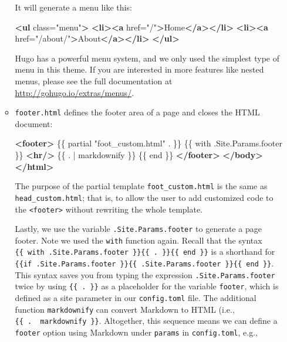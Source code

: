 \documentclass[12pt,]{krantz}
\makeatletter
\newenvironment{Shaded}{\begin{snugshade}}{\end{snugshade}}
\newcommand{\KeywordTok}[1]{\textcolor[rgb]{0.13,0.29,0.53}{\textbf{#1}}}
\newcommand{\NormalTok}[1]{#1}
\newcommand{\OtherTok}[1]{\textcolor[rgb]{0.56,0.35,0.01}{#1}}
\newcommand{\StringTok}[1]{\textcolor[rgb]{0.31,0.60,0.02}{#1}}
\newenvironment{kframe}{%
\medskip{}
\setlength{\fboxsep}{.8em}
 \def\at@end@of@kframe{}%
 \ifinner\ifhmode%
  \def\at@end@of@kframe{\end{minipage}}%
  \begin{minipage}{\columnwidth}%
 \fi\fi%
 \def\FrameCommand##1{\hskip\@totalleftmargin \hskip-\fboxsep
 \colorbox{shadecolor}{##1}\hskip-\fboxsep
     \hskip-\linewidth \hskip-\@totalleftmargin \hskip\columnwidth}%
 \MakeFramed {\advance\hsize-\width
   \@totalleftmargin\z@ \linewidth\hsize
   \@setminipage}}%
 {\par\unskip\endMakeFramed%
 \at@end@of@kframe}
\renewenvironment{Shaded}{\begin{kframe}}{\end{kframe}}
\theoremstyle{definition}
\theoremstyle{definition}
\theoremstyle{definition}
\theoremstyle{remark}
\makeatother
\begin{document}
\begin{itemize}
\begin{itemize}
    It will generate a menu like this:

\begin{Shaded}
\begin{Highlighting}[]
\KeywordTok{<ul}\OtherTok{ class=}\StringTok{"menu"}\KeywordTok{>}
  \KeywordTok{<li><a}\OtherTok{ href=}\StringTok{"/"}\KeywordTok{>}\NormalTok{Home}\KeywordTok{</a></li>}
  \KeywordTok{<li><a}\OtherTok{ href=}\StringTok{"/about/"}\KeywordTok{>}\NormalTok{About}\KeywordTok{</a></li>}
\KeywordTok{</ul>}
\end{Highlighting}
\end{Shaded}

    Hugo has a powerful menu system, and we only used the simplest type
    of menu in this theme. If you are interested in more features like
    nested menus, please see the full documentation at
    \url{http://gohugo.io/extras/menus/}.
  \item
    \texttt{footer.html} defines the footer area of a
    page and closes the HTML document:

\begin{Shaded}
\begin{Highlighting}[]
  \KeywordTok{<footer>}
\NormalTok{  \{\{ partial "foot_custom.html" . \}\}}
\NormalTok{  \{\{ with .Site.Params.footer \}\}}
  \KeywordTok{<hr/>}
\NormalTok{  \{\{ . | markdownify \}\}}
\NormalTok{  \{\{ end \}\}}
  \KeywordTok{</footer>}
  \KeywordTok{</body>}
\KeywordTok{</html>}
\end{Highlighting}
\end{Shaded}

    The purpose of the partial template \texttt{foot\_custom.html} is
    the same as \texttt{head\_custom.html}; that is, to allow the user
    to add customized code to the
    \texttt{\textless{}footer\textgreater{}} without rewriting the whole
    template.

    Lastly, we use the variable \texttt{.Site.Params.footer} to generate
    a page footer. Note we used the \texttt{with} function again. Recall
    that the syntax
    \texttt{\{\{\ with\ .Site.Params.footer\ \}\}\{\{\ .\ \}\}\{\{\ end\ \}\}}
    is a shorthand for
    \texttt{\{\{if\ .Site.Params.footer\ \}\}\{\{\ .Site.Params.footer\ \}\}\{\{\ end\ \}\}}.
    This syntax saves you from typing the expression
    \texttt{.Site.Params.footer} twice by using \texttt{\{\{\ .\ \}\}}
    as a placeholder for the variable \texttt{footer}, which is defined
    as a site parameter in our \texttt{config.toml} file. The additional
    function \texttt{markdownify} can convert Markdown to HTML (i.e.,
    \texttt{\{\{\ .\ \textbar{}\ markdownify\ \}\}}. Altogether, this
    sequence means we can define a \texttt{footer} option using Markdown
    under \texttt{params} in \texttt{config.toml}, e.g.,


\end{itemize}
\end{itemize}
\end{document}
